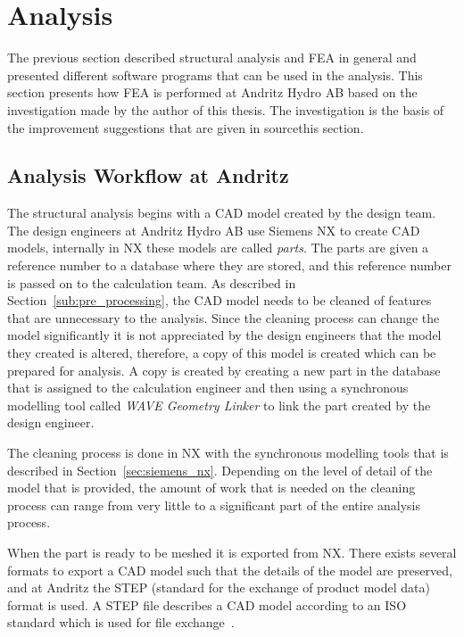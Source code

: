 
\chapter{Analysis} %
\label{cha:analysis}
The previous section described structural analysis and FEA in general and presented different software programs that can be used in the analysis. This section presents how FEA is performed at Andritz Hydro AB based on the investigation made by the author of this thesis. The investigation is the basis of the improvement suggestions that are given in sourcethis section.

\section{Analysis Workflow at Andritz} %
\label{sec:analysis_workflow_at_andritz}
The structural analysis begins with a CAD model created by the design team. The design engineers at Andritz Hydro AB use Siemens NX to create CAD models, internally in NX these models are called \textit{parts}. The parts are given a reference number to a database where they are stored, and this reference number is passed on to the calculation team. As described in Section~\ref{sub:pre_processing}, the CAD model needs to be cleaned of features that are unnecessary to the analysis. Since the cleaning process can change the model significantly it is not appreciated by the design engineers that the model they created is altered, therefore, a copy of this model is created which can be prepared for analysis. A copy is created by creating a new part in the database that is assigned to the calculation engineer and then using a synchronous modelling tool called \textit{WAVE Geometry Linker} to link the part created by the design engineer.

The cleaning process is done in NX with the synchronous modelling tools that is described in Section~\ref{sec:siemens_nx}. Depending on the level of detail of the model that is provided, the amount of work that is needed on the cleaning process can range from very little to a significant part of the entire analysis process. 

When the part is ready to be meshed it is exported from NX. There exists several formats to export a CAD model such that the details of the model are preserved, and at Andritz the STEP (standard for the exchange of product model data) format is used. A STEP file describes a CAD model according to an ISO standard which is used for file exchange~\cite{stepiso}.

